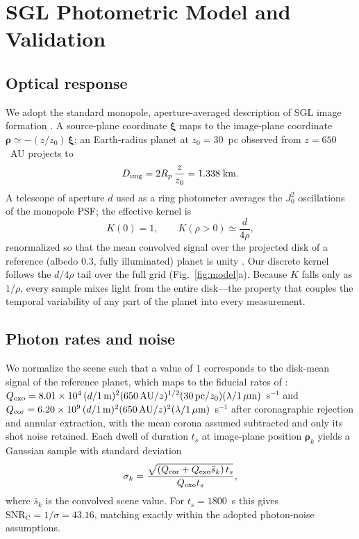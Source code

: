 \documentclass[twocolumn,10pt]{article}
\begin{document}
\section{SGL Photometric Model and Validation}
\label{sec:model}

\subsection{Optical response}
We adopt the standard monopole, aperture-averaged description of SGL
image formation \citep{tt20psf,toth21,tur26bench}. A source-plane
coordinate $\boldsymbol{\xi}$ maps to the image-plane coordinate
$\boldsymbol{\rho}\simeq-(z/z_0)\,\boldsymbol{\xi}$; an Earth-radius
planet at $z_0=30$~pc observed from $z=650$~AU projects to
\begin{equation}
D_{\rm img}=2R_p\,\frac{z}{z_0}=1.338\;{\rm km}.
\end{equation}
A telescope of aperture $d$ used as a ring photometer averages the
$J_0^2$ oscillations of the monopole PSF; the effective kernel is
\begin{equation}
K(0)=1,\qquad K(\rho>0)\simeq\frac{d}{4\rho},
\label{eq:kernel}
\end{equation}
renormalized so that the mean convolved signal over the projected disk
of a reference (albedo 0.3, fully illuminated) planet is unity
\citep{tur26bench}. Our discrete kernel follows the $d/4\rho$ tail over
the full grid (Fig.~\ref{fig:model}a). Because $K$ falls only as
$1/\rho$, every sample mixes light from the entire disk---the property
that couples the temporal variability of any part of the planet into
every measurement.

\subsection{Photon rates and noise}
We normalize the scene such that a value of 1 corresponds to the
disk-mean signal of the reference planet, which maps to the fiducial
rates of \citet{tt22mnras}:
$Q_{\rm exo}=8.01\times10^4\,(d/1\,{\rm m})^2(650\,{\rm AU}/z)^{1/2}
(30\,{\rm pc}/z_0)(\lambda/1\,\mu{\rm m})$~s$^{-1}$ and
$Q_{\rm cor}=6.20\times10^9\,(d/1\,{\rm m})^2(650\,{\rm AU}/z)^2
(\lambda/1\,\mu{\rm m})$~s$^{-1}$ after coronagraphic rejection and
annular extraction, with the mean corona assumed subtracted and only its
shot noise retained. Each dwell of duration $t_s$ at image-plane position
$\boldsymbol{\rho}_k$ yields a Gaussian sample with standard deviation
\begin{equation}
\sigma_k=\frac{\sqrt{(Q_{\rm cor}+Q_{\rm exo}\bar{s}_k)\,t_s}}
{Q_{\rm exo}t_s},
\label{eq:noise}
\end{equation}
where $\bar s_k$ is the convolved scene value. For $t_s=1800$~s this
gives $\mathrm{SNR_C}=1/\sigma=43.16$, matching \citet{tur26bench}
exactly within the adopted photon-noise assumptions.
\end{document}
